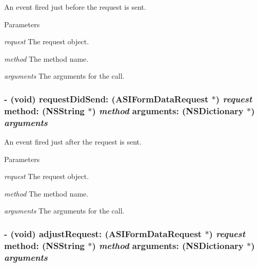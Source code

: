 An event fired just before the request is sent. 
\begin{DoxyParams}{Parameters}
\item[{\em request}]The request object. \item[{\em method}]The method name. \item[{\em arguments}]The arguments for the call. \end{DoxyParams}
\hypertarget{protocol_r_m_call_protocol-p_ae502b8d3070e9de7a6b125b16a8db5cf}{
\subsubsection[{requestDidSend:method:arguments:}]{\setlength{\rightskip}{0pt plus 5cm}-\/ (void) requestDidSend: (ASIFormDataRequest $\ast$) {\em request}\/ method: (NSString $\ast$) {\em method}\/ arguments: (NSDictionary $\ast$) {\em arguments}}}
\label{protocol_r_m_call_protocol-p_ae502b8d3070e9de7a6b125b16a8db5cf}


An event fired just after the request is sent. 
\begin{DoxyParams}{Parameters}
\item[{\em request}]The request object. \item[{\em method}]The method name. \item[{\em arguments}]The arguments for the call. \end{DoxyParams}
\hypertarget{protocol_r_m_call_protocol-p_ab3c27370fb06c6083131b5338dcabe2f}{
\subsubsection[{adjustRequest:method:arguments:}]{\setlength{\rightskip}{0pt plus 5cm}-\/ (void) adjustRequest: (ASIFormDataRequest $\ast$) {\em request}\/ method: (NSString $\ast$) {\em method}\/ arguments: (NSDictionary $\ast$) {\em arguments}}}
\label{protocol_r_m_call_protocol-p_ab3c27370fb06c6083131b5338dcabe2f}


